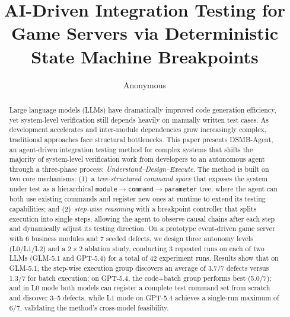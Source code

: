 \documentclass[sigconf,nonacm]{acmart}
\begin{document}
\title{AI-Driven Integration Testing for Game Servers via Deterministic State Machine Breakpoints}

\author{Anonymous}

\begin{abstract}
Large language models (LLMs) have dramatically improved code generation efficiency, yet system-level verification still depends heavily on manually written test cases. As development accelerates and inter-module dependencies grow increasingly complex, traditional approaches face structural bottlenecks. This paper presents DSMB-Agent, an agent-driven integration testing method for complex systems that shifts the majority of system-level verification work from developers to an autonomous agent through a three-phase process: \emph{Understand--Design--Execute}. The method is built on two core mechanisms: (1)~a \emph{tree-structured command space} that exposes the system under test as a hierarchical \texttt{module$\to$command$\to$parameter} tree, where the agent can both use existing commands and register new ones at runtime to extend its testing capabilities; and (2)~\emph{step-wise reasoning} with a breakpoint controller that splits execution into single steps, allowing the agent to observe causal chains after each step and dynamically adjust its testing direction. On a prototype event-driven game server with 6 business modules and 7 seeded defects, we design three autonomy levels (L0/L1/L2) and a $2\times2$ ablation study, conducting 3 repeated runs on each of two LLMs (GLM-5.1 and GPT-5.4) for a total of 42 experiment runs. Results show that on GLM-5.1, the step-wise execution group discovers an average of 3.7/7 defects versus 1.3/7 for batch execution; on GPT-5.4, the code+batch group performs best (5.0/7); and in L0 mode both models can register a complete test command set from scratch and discover 3--5 defects, while L1 mode on GPT-5.4 achieves a single-run maximum of 6/7, validating the method's cross-model feasibility.
\end{abstract}


\maketitle

\end{document}
